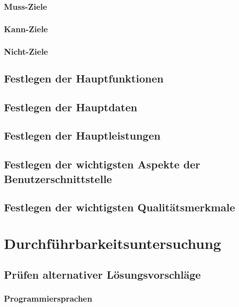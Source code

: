 \documentclass[a4paper,12pt]{scrreprt}
\begin{document}
		\subsection{Muss-Ziele}
			
		\subsection{Kann-Ziele}
			
			
		\subsection{Nicht-Ziele}
			
	\section{Festlegen der Hauptfunktionen}
		
	\section{Festlegen der Hauptdaten}
		
	\section{Festlegen der Hauptleistungen}
		
	\section{Festlegen der wichtigsten Aspekte der Benutzerschnittstelle}
		
	\section{Festlegen der wichtigsten Qualit\"atsmerkmale}
		
\chapter{Durchf\"uhrbarkeitsuntersuchung}
	
	\section{Pr\"ufen alternativer L\"osungsvorschl\"age}
	
		\subsection{Programmiersprachen}
		
\end{document}
